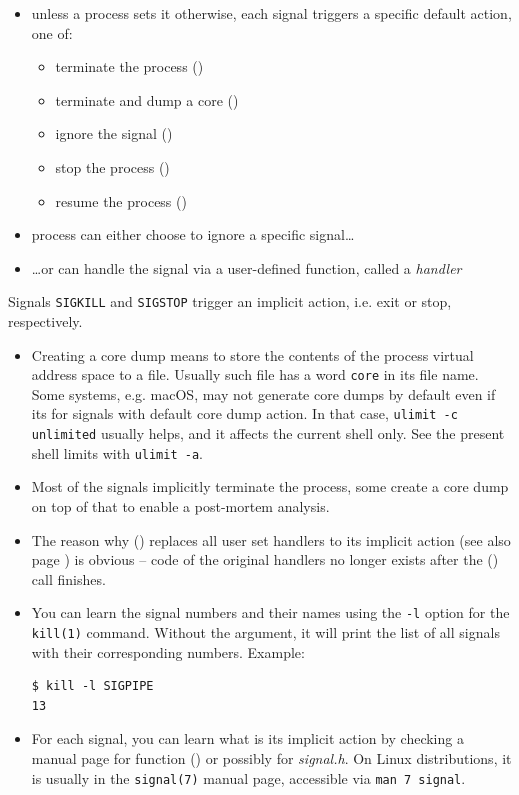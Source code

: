 

\begin{slide}
\begin{itemize}
\item unless a process sets it otherwise, each signal triggers a specific
default action, one of:
    \begin{itemize}
    \item terminate the process ()
    \item terminate and dump a core ()
    \item ignore the signal ()
    \item stop the process ()
    \item resume the process ()
    \end{itemize}
\item process can either choose to ignore a specific signal\dots
\item \dots{}or can handle the signal via a user-defined function,
called a \emph{handler}
\end{itemize}

Signals \texttt{SIGKILL} and \texttt{SIGSTOP}  trigger an implicit
action, i.e. exit or stop, respectively.
\end{slide}

\begin{itemize}
\item Creating a core dump means to store the contents of the process virtual
address space to a file.  Usually such file has a word \texttt{core} in its
file name. Some systems, e.g. macOS, may not generate core dumps by default even
if its for signals with default core dump action.  In that case,
\texttt{ulimit -c unlimited} usually helps, and it affects the current shell
only.  See the present shell limits with \texttt{ulimit -a}.
\item Most of the signals implicitly terminate the process, some create a core
dump on top of that to enable a post-mortem analysis.
\item The reason why () replaces all user set handlers to its
implicit action (see also page \pageref{EXEC}) is obvious -- code of the
original handlers no longer exists after the () call finishes.
\item You can learn the signal numbers and their names using the \texttt{-l}
option for the \texttt{kill(1)} command.  Without the argument, it will print
the list of all signals with their corresponding numbers.  Example:

\begin{verbatim}
$ kill -l SIGPIPE
13
\end{verbatim}
\item For each signal, you can learn what is its implicit action by checking a
manual page for function () or possibly for \emph{signal.h}.  On
Linux distributions, it is usually in the \texttt{signal(7)} manual page,
accessible via \texttt{man 7 signal}.
\end{itemize}


